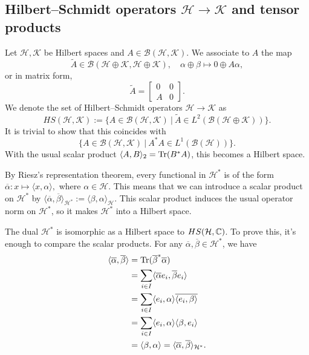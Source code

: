 \subsection{Hilbert--Schmidt operators $\mathcal{H} \to \mathcal{K}$ and tensor products}

Let $\mathcal{H}, \mathcal{K}$ be Hilbert spaces and $A \in \mathcal{B} (\mathcal{H}, \mathcal{K})$.
We associate to $A$ the map 
$$\widetilde{A} \in \mathcal{B} (\mathcal{H} \oplus \mathcal{K}, \mathcal{H} \oplus \mathcal{K}),\quad \alpha \oplus \beta \mapsto 0 \oplus A \alpha,$$
or in matrix form,
$$\widetilde{A} = \begin{bmatrix}
  0 & 0\\
  A & 0
\end{bmatrix}.$$
We denote the set of Hilbert--Schmidt operators $\mathcal{H} \to \mathcal{K}$ as 
$$HS (\mathcal{H}, \mathcal{K}) := \{A \in \mathcal{B} (\mathcal{H}, \mathcal{K})\ |\ \widetilde{A} \in L^2 (\mathcal{B}(\mathcal{H} \oplus \mathcal{K}))\}.$$ 
It is trivial to show that this coincides with 
$$\{A \in \mathcal{B} (\mathcal{H}, \mathcal{K})\ |\ A^* A \in L^1 (\mathcal{B}(\mathcal{H}))\}.$$
With the usual scalar product $\langle A, B \rangle_{2} = \operatorname{Tr}(B^* A)$, this becomes a Hilbert space.

\begin{remark}
  By Riesz's representation theorem, every functional in $\mathcal{H}^*$
  is of the form $\overline{\alpha}: x \mapsto \langle x, \alpha \rangle,$
  where $\alpha \in \mathcal{H}$. 
  This means that we can introduce a scalar product on $\mathcal{H}^*$ by 
  $\langle \overline{\alpha}, \overline{\beta} \rangle_{\mathcal{H}^*} := \langle \beta, \alpha \rangle_{\mathcal{H}}.$
  This scalar product induces the usual operator norm on $\mathcal{H}^*$, so it makes $\mathcal{H}^*$
  into a Hilbert space. 
\end{remark}

\begin{example}
  The dual $\mathcal{H}^*$ is isomorphic as a Hilbert space to $HS(\mathcal{H}, \mathbb {C})$. To prove this, it's enough to compare the scalar products.
  For any $\overline{\alpha}, \overline{\beta} \in \mathcal{H}^*$, we have 
  \begin{align*}
    \langle \overline{\alpha}, \overline{\beta} \rangle &= \operatorname{Tr} (\overline{\beta}^* \overline{\alpha})\\
    &= \sum_{i \in I} \langle \overline{\alpha} e_i, \overline{\beta} e_i\rangle\\
    &= \sum_{i \in I} \langle e_i, \alpha \rangle \overline{\langle e_i, \beta \rangle}\\
    &= \sum_{i \in I} \langle e_i, \alpha \rangle {\langle \beta, e_i \rangle}\\
    &= \langle \beta, \alpha\rangle = \langle \overline{\alpha}, \overline{\beta} \rangle_{\mathcal{H}^*}.
  \end{align*}
\end{example}

